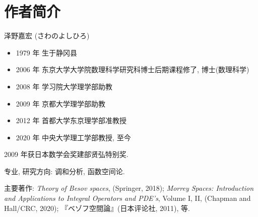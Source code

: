 \clearpage
\chapter*{作者简介}

\begin{center}
\large 泽野嘉宏 \quad (さわのよしひろ)
\end{center}

\begin{itemize}
\item 1979 年 生于静冈县
\item 2006 年 东京大学大学院数理科学研究科博士后期课程修了, 博士(数理科学)
\item 2008 年 学习院大学理学部助教
\item 2009 年 京都大学理学部助教
\item 2012 年 首都大学东京理学部准教授
\item 2020 年 中央大学理工学部教授, 至今
\end{itemize}

2009 年获日本数学会奖建部贤弘特别奖.

专业, 研究方向: 调和分析, 函数空间论.

主要著作: \emph{Theory of Besov spaces}, (Springer, 2018); \emph{Morrey Spaces: Introduction and Applications to Integral Operators and PDE's}, Volume I, II, (Chapman and Hall/CRC, 2020); 『ベゾフ空間論』(日本评论社, 2011), 等.
